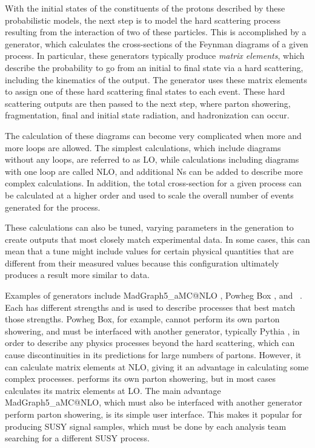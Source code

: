 With the initial states of the constituents of the protons described by these probabilistic models, the next step is to model the hard scattering process resulting from the interaction of two of these particles. This is accomplished by a generator, which calculates the cross-sections of the Feynman diagrams of a given process. In particular, these generators typically produce \textit{matrix elements}, which describe the probability to go from an initial to final state via a hard scattering, including the kinematics of the output. The generator uses these matrix elements to assign one of these hard scattering final states to each event. These hard scattering outputs are then passed to the next step, where parton showering, fragmentation, final and initial state radiation, and hadronization can occur.

The calculation of these diagrams can become very complicated when more and more loops are allowed. The simplest calculations, which include diagrams without any loops, are referred to as \ac{LO}, while calculations including diagrams with one loop are called \ac{NLO}, and additional Ns can be added to describe more complex calculations. In addition, the total cross-section for a given process can be calculated at a higher order and used to scale the overall number of events generated for the process. 

These calculations can also be tuned, varying parameters in the generation to create outputs that most closely match experimental data. In some cases, this can mean that a tune might include values for certain physical quantities that are different from their measured values because this configuration ultimately produces a result more similar to data. 

Examples of generators include {\sc MadGraph5\_aMC@NLO} \cite{Alwall:2014hca}, {\sc Powheg Box} \cite{PowhegBOX1,PowhegBOX2,PowhegBOX3}, and \sherpa~\cite{sherpa}. Each has different strengths and is used to describe processes that best match those strengths. {\sc Powheg Box}, for example, cannot perform its own parton showering, and must be interfaced with another generator, typically {\sc Pythia} \cite{Sjostrand:2006za}, in order to describe any physics processes beyond the hard scattering, which can cause discontinuities in its predictions for large numbers of partons. However, it can calculate matrix elements at \ac{NLO}, giving it an advantage in calculating some complex processes. \sherpa performs its own parton showering, but in most cases calculates its matrix elements at \ac{LO}. The main advantage {\sc MadGraph5\_aMC@NLO}, which must also be interfaced with another generator perform parton showering, is its simple user interface. This makes it popular for producing \ac{SUSY} signal samples, which must be done by each analysis team searching for a different \ac{SUSY} process. 

